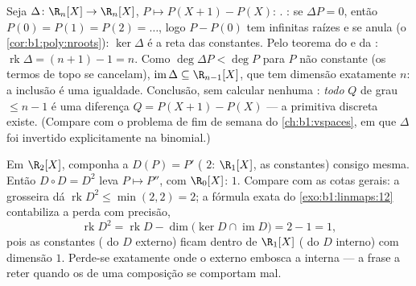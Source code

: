 \begin{example}
\label{ex:b1:linmaps:delta}
Seja $\Delta \colon \R_n[X] \to \R_n[X]$, $P \mapsto P(X+1) -
P(X)$: . : se $\Delta P = 0$, então $P(0) = P(1) =
P(2) = \dots$, logo
$P - P(0)$ tem infinitas raízes e se anula (o \cref{cor:b1:poly:nroots}): $\ker\Delta$ é a reta das
constantes. Pelo teorema do  e da : $\operatorname{rk}\Delta = (n + 1) - 1
= n$. Como $\deg \Delta P < \deg P$
para $P$ não constante (os termos de topo se cancelam), $\operatorname{im}\Delta \subseteq \R_{n-1}[X]$, que
tem dimensão exatamente $n$: a inclusão é uma igualdade. Conclusão,
sem calcular nenhuma : \emph{todo}  $Q$ de grau
$\leq n - 1$ é uma diferença $Q = P(X+1)
- P(X)$ --- a primitiva discreta existe.
(Compare com o problema de fim de semana do \cref{ch:b1:vspaces}, em que $\Delta$
foi invertido explicitamente na  binomial.)
\end{example}

\begin{example}
\label{ex:b1:linmaps:rankbookkeeping}
Em $\R_2[X]$, componha a  $D(P) = P'$ ( $2$: 
$\R_1[X]$,  as constantes) consigo mesma. Então $D
\circ D = D^2$ leva
$P \mapsto P''$, com  $\R_0[X]$:  $1$. Compare com as cotas
gerais: a grosseira dá $\operatorname{rk} D^2 \leq \min(2, 2) = 2$; a fórmula exata do \cref{exo:b1:linmaps:12} contabiliza
a perda com precisão,
\[
\operatorname{rk} D^2 = \operatorname{rk} D -
\dim\bigl(\ker D \cap \operatorname{im} D\bigr) = 2 - 1 = 1 ,
\]
pois as constantes ( do $D$ externo) ficam dentro de
$\R_1[X]$ ( do $D$ interno) com dimensão $1$. Perde-se 
exatamente onde o  externo embosca a  interna --- a
frase a reter quando os  de uma composição se comportam mal.
\end{example}

